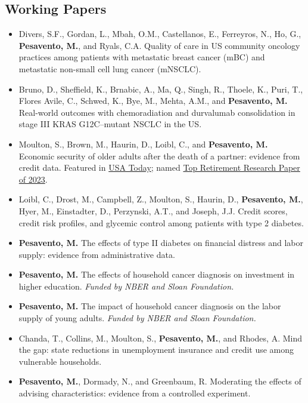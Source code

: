 \subsection{Working Papers}
\begin{itemize}
    \itemsep0.5em
    \item Divers, S.F., Gordan, L., Mbah, O.M., Castellanos, E., Ferreyros, N., Ho, G., \textbf{Pesavento, M.}, and Ryals, C.A. Quality of care in US community oncology practices among patients with metastatic breast cancer (mBC) and metastatic non-small cell lung cancer (mNSCLC).
    \item Bruno, D., Sheffield, K., Brnabic, A., Ma, Q., Singh, R., Thoele, K., Puri, T., Flores Avile, C., Schwed, K., Bye, M., Mehta, A.M., and \textbf{Pesavento, M.} Real-world outcomes with chemoradiation and durvalumab consolidation in stage III KRAS G12C--mutant NSCLC in the US.
    \item Moulton, S., Brown, M., Haurin, D., Loibl, C., and \textbf{Pesavento, M.} Economic security of older adults after the death of a partner: evidence from credit data. Featured in \href{https://www.usatoday.com/story/money/2024/04/26/spouse-dies-credit-score-effect/73424579007/}{\color{lightblue}USA Today}; named \href{https://www.thinkadvisor.com/2023/12/26/cfp-board-picks-7-best-retirement-research-papers-of-2023/}{\color{lightblue}Top Retirement Research Paper of 2023}.
    \item Loibl, C., Drost, M., Campbell, Z., Moulton, S., Haurin, D., \textbf{Pesavento, M.}, Hyer, M., Einstadter, D., Perzynski, A.T., and Joseph, J.J. Credit scores, credit risk profiles, and glycemic control among patients with type 2 diabetes.
    \item \textbf{Pesavento, M.} The effects of type II diabetes on financial distress and labor supply: evidence from administrative data.
    \item \textbf{Pesavento, M.} The effects of household cancer diagnosis on investment in higher education. \textit{Funded by NBER and Sloan Foundation.}
    \item \textbf{Pesavento, M.} The impact of household cancer diagnosis on the labor supply of young adults. \textit{Funded by NBER and Sloan Foundation.}
    \item Chanda, T., Collins, M., Moulton, S., \textbf{Pesavento, M.}, and Rhodes, A. Mind the gap: state reductions in unemployment insurance and credit use among vulnerable households.
    \item \textbf{Pesavento, M.}, Dormady, N., and Greenbaum, R. Moderating the effects of advising characteristics: evidence from a controlled experiment.
\end{itemize}

